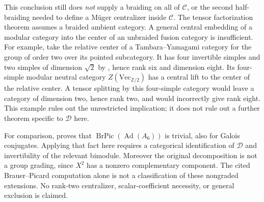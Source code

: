 \documentclass[11pt]{article}
\begin{document}
This conclusion still does \emph{not} supply a braiding on all of
$\mathcal C$, or the second half-braiding needed to define a M\"uger
centralizer inside $\mathcal C$. The tensor factorization theorem
\cite[Theorem 3.13]{DGNO} assumes a braided ambient category. A general
central embedding of a modular category into the center of an
unbraided fusion category is insufficient. For example, take the
relative center of a Tambara--Yamagami category for the group of order
two over its pointed subcategory. It has four invertible simples and
two simples of dimension $\sqrt2$ by \cite[Section 4.2]{GNN}, hence
rank six and dimension eight. Its four-simple modular neutral category
$Z(\mathrm{Vec}_{\mathbb Z/2})$ has a central lift to the center of the
relative center. A tensor splitting by this four-simple category would
leave a category of dimension two, hence rank two, and would incorrectly
give rank eight. This example rules out the unrestricted implication;
it does not rule out a further theorem specific to $\mathcal D$ here.

For comparison, \cite[Theorem 1.2]{EM} proves that
$\operatorname{BrPic}(\operatorname{Ad}(A_6))$ is trivial, also for
Galois conjugates. Applying that fact here requires a categorical
identification of $\mathcal D$ and invertibility of the relevant
bimodule. Moreover the original decomposition is not a group grading,
since $X^2$ has a nonzero complementary component. The cited
Brauer--Picard computation alone is not a classification of these
nongraded extensions. No rank-two centralizer, scalar-coefficient
necessity, or general exclusion is claimed.
\end{document}
